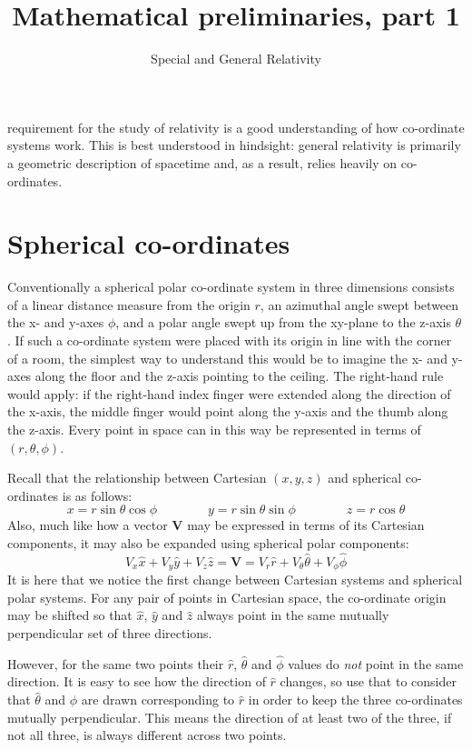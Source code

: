 \documentclass[english,seminar]{lecture}
\title{Mathematical preliminaries, part 1}
\subtitle{Special and General Relativity}
\begin{document}
\noindent{} requirement for the study of relativity is a good understanding of how co-ordinate systems work. This is best understood in hindsight: general relativity is primarily a geometric description of spacetime and, as a result, relies heavily on co-ordinates.

\section{Spherical co-ordinates}
Conventionally a spherical polar co-ordinate system in three dimensions consists of a linear distance measure from the origin $r$, an azimuthal angle swept between the x- and y-axes $\phi$, and a polar angle swept up from the xy-plane to the z-axis $\theta$.  If such a co-ordinate system were placed with its origin in line with the corner of a room, the simplest way to understand this would be to imagine the x- and y-axes along the floor and the z-axis pointing to the ceiling. The right-hand rule would apply: if the right-hand index finger were extended along the direction of the x-axis, the middle finger would point along the y-axis and the thumb along the z-axis. Every point in space can in this way be represented in terms of $(r, \theta, \phi)$.

Recall that the relationship between Cartesian $(x,y,z)$ and spherical co-ordinates is as follows:
\[
x = r\sin\theta\cos\phi \qquad\qquad
y = r\sin\theta\sin\phi \qquad\qquad
z = r\cos\theta
\]
Also, much like how a vector $\mathbf{V}$ may be expressed in terms of its Cartesian components, it may also be expanded using spherical polar components:
\[
V_x \hat{x} + V_y \hat{y} + V_z \hat{z} = \mathbf{V} = V_r \hat{r} + V_\theta \hat{\theta} + V_\phi \hat{\phi}
\]
It is here that we notice the first change between Cartesian systems and spherical polar systems. For any pair of points in Cartesian space, the co-ordinate origin may be shifted so that $\hat{x}$, $\hat{y}$ and $\hat{z}$ always point in the same mutually perpendicular set of three directions.

However, for the same two points their $\hat{r}$, $\hat{\theta}$ and $\hat{\phi}$ values do \textit{not} point in the same direction. It is easy to see how the direction of $\hat{r}$ changes, so use that to consider that $\hat{\theta}$ and $\hat{\phi}$ are drawn corresponding to $\hat{r}$ in order to keep the three co-ordinates mutually perpendicular. This means the direction of at least two of the three, if not all three, is always different across two points.
\end{document}
